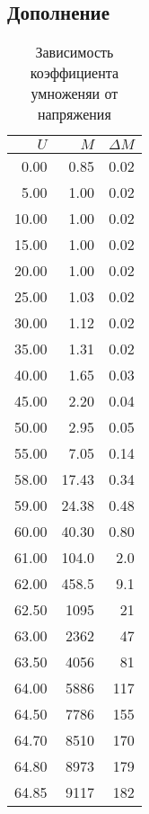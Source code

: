 \subsection*{Дополнение}




\begin{figure}[h!]
    \begin{floatrow}
    \end{floatrow}
\end{figure}

\newpage

\phantom{42}


\begin{table}[ht]
    \centering
    \caption{Зависимость коэффициента умноженяи от напряжения}
\begin{tabular}{rrr}
\toprule
    $U$ &           $M$ &         $\Delta M$ \\
\midrule
 0.00 &    0.85 &   0.02\\
 5.00 &    1.00 &   0.02 \\
10.00 &    1.00 &   0.02 \\
15.00 &    1.00 &   0.02 \\
20.00 &    1.00 &   0.02 \\
25.00 &    1.03 &   0.02 \\
30.00 &    1.12 &   0.02 \\
35.00 &    1.31 &   0.02 \\
40.00 &    1.65 &   0.03 \\
45.00 &    2.20 &   0.04 \\
50.00 &    2.95 &   0.05 \\
55.00 &    7.05 &   0.14 \\
58.00 &   17.43 &   0.34 \\
59.00 &   24.38 &   0.48 \\
60.00 &   40.30 &   0.80 \\
61.00 &  104.0 &   2.0 \\
62.00 &  458.5 &   9.1 \\
62.50 & 1095 &  21 \\
63.00 & 2362 &  47 \\
63.50 & 4056 &  81 \\
64.00 & 5886 & 117 \\
64.50 & 7786 & 155 \\
64.70 & 8510 & 170 \\
64.80 & 8973 & 179 \\
64.85 & 9117 & 182 \\
\bottomrule
\end{tabular}
\end{table}